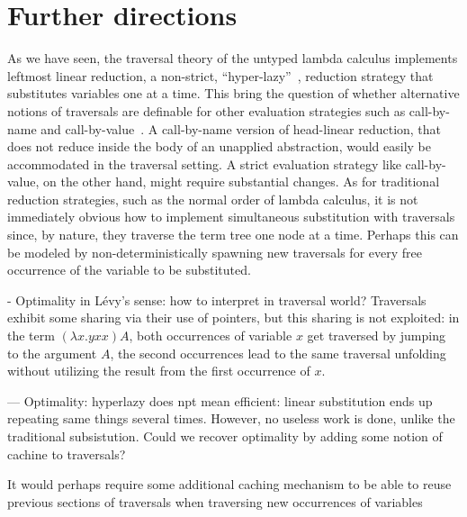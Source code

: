\documentclass{elsarticle}
\theoremstyle{plain}
\theoremstyle{definition}
\newcommand{\travulc}{\travset}
\newcommand\pathset{{\mathcal{P}aths}} %
\begin{document}

\section{Further directions}

As we have seen, the traversal theory of the untyped lambda calculus implements leftmost linear reduction, a non-strict, ``hyper-lazy''~\cite{danosherbelinregnier1996}, reduction strategy that substitutes variables one at a time. This bring the question of whether alternative notions of traversals are definable for other evaluation strategies such as call-by-name and call-by-value~\cite{plotkin-75}. A call-by-name version of head-linear reduction, that does not reduce inside the body of an unapplied abstraction, would easily be accommodated in the traversal setting. A strict evaluation strategy like call-by-value, on the other hand, might require substantial changes. As for traditional reduction strategies, such as the normal order of lambda calculus, it is not immediately obvious how to implement simultaneous substitution with traversals since, by nature, they traverse the term tree one node at a time. Perhaps this can be modeled by non-deterministically spawning new traversals for every free occurrence of the variable to be substituted.


\begin{todobox}
- Optimality in L\'evy's sense: how to interpret in traversal world?
Traversals exhibit some sharing via their use of pointers, but this sharing is not exploited: in the term $(\lambda x. y x x) A$, both occurrences of variable $x$ get traversed by jumping to the argument $A$, the second occurrences lead to the same traversal unfolding without utilizing the result from the first occurrence of $x$.

--- Optimality: hyperlazy does npt mean efficient: linear substitution ends up repeating same things several times. However, no useless work is done, unlike the traditional subsistution. Could we recover optimality by adding some notion of cachine to traversals?

It would perhaps require some additional caching mechanism to be able to reuse previous sections of traversals when traversing new occurrences of variables

\end{todobox}
\end{document}
